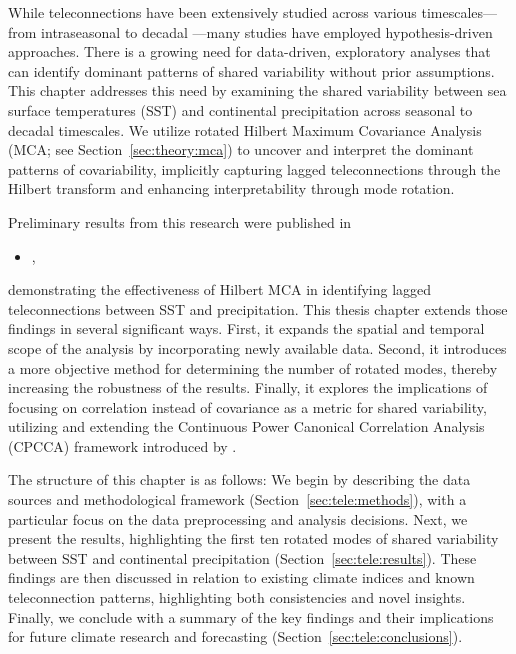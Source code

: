 While teleconnections have been extensively studied across various timescales---from intraseasonal \cite[e.g.][]{stan_review_2017,yuan_interconnected_2018} to decadal \cite[e.g.][]{li_tropical_2021}---many studies have employed hypothesis-driven approaches. There is a growing need for data-driven, exploratory analyses that can identify dominant patterns of shared variability without prior assumptions. This chapter addresses this need by examining the shared variability between sea surface temperatures (SST) and continental precipitation across seasonal to decadal timescales. We utilize rotated Hilbert Maximum Covariance Analysis (MCA; see Section~\ref{sec:theory:mca}) to uncover and interpret the dominant patterns of covariability, implicitly capturing lagged teleconnections through the Hilbert transform and enhancing interpretability through mode rotation.

Preliminary results from this research were published in 

\begin{itemize}
    \item {},
\end{itemize}

demonstrating the effectiveness of Hilbert MCA in identifying lagged teleconnections between SST and precipitation. This thesis chapter extends those findings in several significant ways. First, it expands the spatial and temporal scope of the analysis by incorporating newly available data. Second, it introduces a more objective method for determining the number of rotated modes, thereby increasing the robustness of the results. Finally, it explores the implications of focusing on correlation instead of covariance as a metric for shared variability, utilizing and extending the Continuous Power Canonical Correlation Analysis (CPCCA) framework introduced by \citet{swenson_continuum_2015}.

The structure of this chapter is as follows: We begin by describing the data sources and methodological framework (Section~\ref{sec:tele:methods}), with a particular focus on the data preprocessing and analysis decisions. Next, we present the results, highlighting the first ten rotated modes of shared variability between SST and continental precipitation (Section~\ref{sec:tele:results}). These findings are then discussed in relation to existing climate indices and known teleconnection patterns, highlighting both consistencies and novel insights. Finally, we conclude with a summary of the key findings and their implications for future climate research and forecasting (Section~\ref{sec:tele:conclusions}).



